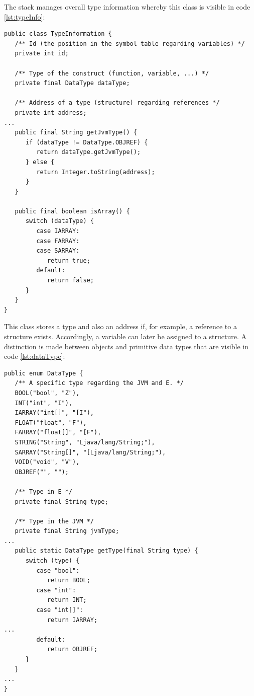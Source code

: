 The stack manages overall type information whereby this class is visible in code \ref{lst:typeInfo}:

\begin{lstlisting}[frame=htrbl, caption={Implementation of {\ttfamily TypeInformation.java}}, label={lst:typeInfo}, basicstyle=\footnotesize]
public class TypeInformation {
   /** Id (the position in the symbol table regarding variables) */
   private int id;

   /** Type of the construct (function, variable, ...) */
   private final DataType dataType;

   /** Address of a type (structure) regarding references */
   private int address;
...
   public final String getJvmType() {
      if (dataType != DataType.OBJREF) {
         return dataType.getJvmType();
      } else {
         return Integer.toString(address);
      }
   }

   public final boolean isArray() {
      switch (dataType) {
         case IARRAY:
         case FARRAY:
         case SARRAY:
            return true;
         default:
            return false;
      }
   }
}
\end{lstlisting}

This class stores a type and also an address if, for example, a reference to a structure exists. Accordingly, a variable can later be assigned to a structure. A distinction is made between objects and primitive data types that are visible in code \ref{lst:dataType}:

\begin{lstlisting}[frame=htrbl, caption={Implementation of {\ttfamily DataType.java}}, label={lst:dataType}, basicstyle=\footnotesize]
public enum DataType {
   /** A specific type regarding the JVM and E. */
   BOOL("bool", "Z"),
   INT("int", "I"),
   IARRAY("int[]", "[I"),
   FLOAT("float", "F"),
   FARRAY("float[]", "[F"),
   STRING("String", "Ljava/lang/String;"),
   SARRAY("String[]", "[Ljava/lang/String;"),
   VOID("void", "V"),
   OBJREF("", "");

   /** Type in E */
   private final String type;

   /** Type in the JVM */
   private final String jvmType;
...
   public static DataType getType(final String type) {
      switch (type) {
         case "bool":
            return BOOL;
         case "int":
            return INT;
         case "int[]":
            return IARRAY;
...
         default:
            return OBJREF;
      }
   }
...
}
\end{lstlisting}

